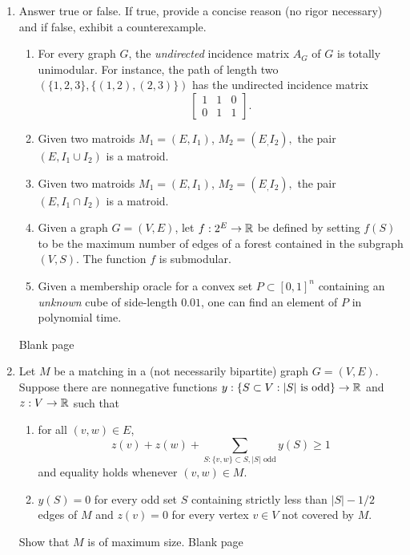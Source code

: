 \documentclass[12pt]{article}
\begin{document}
\begin{enumerate}
\item Answer true or false. If true, provide a concise reason (no rigor necessary) and if false, exhibit a counterexample. 
\begin{enumerate}
\item For every graph $G$, the \emph{undirected} incidence matrix $A_G$ of $G$ is totally unimodular. For instance, the path of length two $(\{1,2,3\}, \{(1,2), (2,3)\})$ has the undirected incidence matrix
$$ \begin{bmatrix}
1 & 1 & 0 \\
0 & 1 & 1
\end{bmatrix}. $$
\item Given two matroids $M_1 = (E, I_1)$, $M_2 = (E_, I_2),$ the pair $(E, I_1 \cup I_2)$ is a matroid.
\item Given two matroids $M_1 = (E, I_1)$, $M_2 = (E_, I_2),$ the pair $(E, I_1 \cap I_2)$ is a matroid.
\item Given a graph $G = (V, E)$, let $f:2^E \to {\mathbb R}$ be defined by setting $f(S)$ to be the maximum number of edges of a forest contained in the subgraph $(V, S)$. The function $f$ is submodular.
\item Given a membership oracle for a convex set $P\subset [0,1]^n$ containing an \emph{unknown} cube of side-length $0.01$, one can find an element of $P$ in polynomial time. \end{enumerate}
\newpage
Blank page
\newpage
\item Let $M$ be a matching in a (not necessarily bipartite) graph $G = (V, E)$. Suppose there are nonnegative functions
$y:\{S\subset V:|S| \text{ is odd}\} \to {\mathbb R}$ and $z: V \to {\mathbb R}$ such that 
\begin{enumerate}
\item for all $(v,w) \in E$, 
$$ z(v) + z(w) + \sum_{S: \{v,w\} \subset S, |S| \text{ odd} } y(S) \geq 1$$ and equality holds whenever $(v,w) \in M$. 
\item $y(S) = 0$ for every odd set $S$ containing strictly less than $|S|-1/2$ edges of $M$ and $z(v) = 0$ for every vertex $v \in V$ not covered by $M$.
\end{enumerate}
Show that $M$ is of maximum size.
\newpage
Blank page
\newpage


\end{enumerate}
\end{document}
